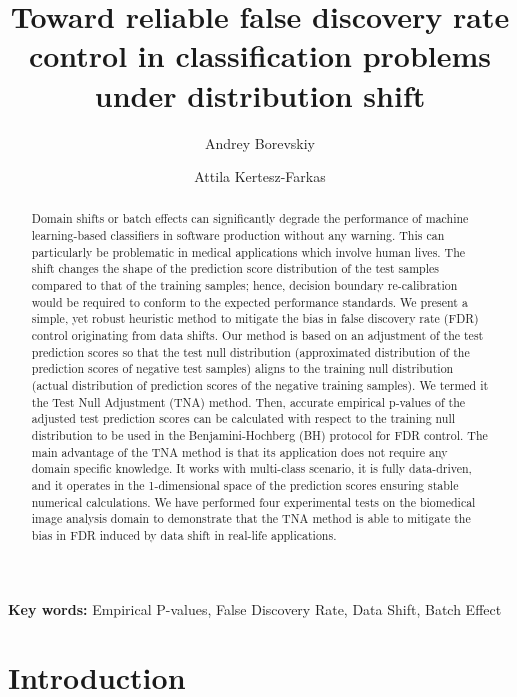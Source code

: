 \documentclass{article}
\author[1]{Andrey Borevskiy}
\author[1,2]{Attila Kertesz-Farkas}
\affil[1]{Laboratory on AI for Computational Biology, Faculty of Computer Science, HSE University,  11 Pokrovsky Bvld., Moscow 109028, Russian Federation}
\affil[2]{Email: kfattila@yandex.com}
\title{Toward reliable false discovery rate control in classification problems under distribution shift}
\begin{document}
\maketitle

\begin{abstract}
	Domain shifts or batch effects can significantly degrade the performance of machine learning-based classifiers in software production without any warning. This can particularly be problematic in medical applications which involve human lives. The shift changes the shape of the prediction score distribution of the test samples compared to that of the training samples; hence, decision boundary re-calibration would be required to conform to the expected performance standards. We present a simple, yet robust heuristic method to mitigate the bias in false discovery rate (FDR) control originating from data shifts. Our method is based on an adjustment of the test prediction scores so that the test null distribution (approximated distribution of the prediction scores of negative test samples) aligns to the training null distribution (actual distribution of prediction scores of the negative training samples). We termed it the Test Null Adjustment (TNA) method. Then, accurate empirical p-values of the adjusted test prediction scores can be calculated with respect to the training null distribution to be used in the Benjamini-Hochberg (BH) protocol for FDR control. The main advantage of the TNA method is that its application does not require any domain specific knowledge. It works with multi-class scenario, it is fully data-driven, and it operates in the 1-dimensional space of the prediction scores ensuring stable numerical calculations. We have performed four experimental tests on the biomedical image analysis domain to demonstrate that the TNA method is able to mitigate the bias in FDR induced by data shift in real-life applications. 


\end{abstract}
\textbf{Key words:} Empirical P-values, False Discovery Rate, Data Shift, Batch Effect

\section{Introduction}
\end{document}
